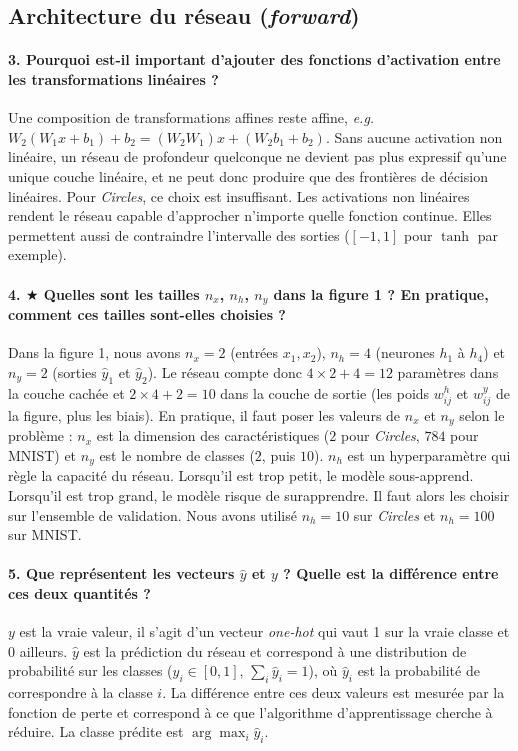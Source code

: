 \documentclass{report}
\begin{document}
\subsection{Architecture du réseau (\textit{forward})}
\paragraph{3. Pourquoi est-il important d'ajouter des fonctions d'activation entre les transformations linéaires ?}
Une composition de transformations affines reste affine, \emph{e.g.} $W_2(W_1 x + b_1) + b_2 = (W_2 W_1) x + (W_2 b_1 + b_2)$. Sans aucune activation non linéaire, un réseau de profondeur quelconque ne devient pas plus expressif qu'une unique couche linéaire, et ne peut donc produire que des frontières de décision linéaires. Pour \textit{Circles}, ce choix est insuffisant. Les activations non linéaires rendent le réseau capable d'approcher n'importe quelle fonction continue. Elles permettent aussi de contraindre l'intervalle des sorties ($[-1, 1]$ pour $\tanh$ par exemple).

\paragraph{4. $\bigstar$ Quelles sont les tailles $n_x$, $n_h$, $n_y$ dans la figure 1 ? En pratique, comment ces tailles sont-elles choisies ?}
Dans la figure 1, nous avons $n_x = 2$ (entrées $x_1, x_2$), $n_h = 4$ (neurones $h_1$ à $h_4$) et $n_y = 2$ (sorties $\hat{y}_1$ et $\hat{y}_2$). Le réseau compte donc $4 \times 2 + 4 = 12$ paramètres dans la couche cachée et $2 \times 4 + 2 = 10$ dans la couche de sortie (les poids $w^h_{ij}$ et $w^y_{ij}$ de la figure, plus les biais). En pratique, il faut poser les valeurs de $n_x$ et $n_y$ selon le problème : $n_x$ est la dimension des caractéristiques ($2$ pour \textit{Circles}, $784$ pour MNIST) et $n_y$ est le nombre de classes ($2$, puis $10$). $n_h$ est un hyperparamètre qui règle la capacité du réseau. Lorsqu'il est trop petit, le modèle sous-apprend. Lorsqu'il est trop grand, le modèle risque de surapprendre. Il faut alors les choisir sur l'ensemble de validation. Nous avons utilisé $n_h = 10$ sur \textit{Circles} et $n_h = 100$ sur MNIST.

\paragraph{5. Que représentent les vecteurs $\hat{y}$ et $y$ ? Quelle est la différence entre ces deux quantités ?}
$y$ est la vraie valeur, il s'agit d'un vecteur \textit{one-hot} qui vaut 1 sur la vraie classe et 0 ailleurs. $\hat{y}$ est la prédiction du réseau et correspond à une distribution de probabilité sur les classes ($\hat{y}_i \in [0, 1]$, $\sum_i \hat{y}_i = 1$), où $\hat{y}_i$ est la probabilité de correspondre à la classe $i$. La différence entre ces deux valeurs est mesurée par la fonction de perte et correspond à ce que l'algorithme d'apprentissage cherche à réduire. La classe prédite est $\arg\max_i \hat{y}_i$.
\end{document}
